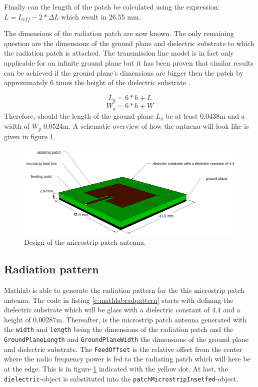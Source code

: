 Finally can the length of the patch be calculated using the expression: $L = L_{eff} - 2 * \Delta L$
which result in 26.55 mm.

The dimensions of the radiation patch are now known. The only remaining question are the dimensions of the ground plane and dielectric substrate to which the 
radiation patch is attached. The transmission line model is in fact only applicable for an infinite ground plane but it has been proven that similar results
can be achieved if the ground plane's dimensions are bigger then the patch by approximately 6 times the height of the dielectric substrate \cite{J14_antennadesign,J15_antennadesign}.

\begin{equation} 
L_{g} = 6 * h + L
\end{equation}
\begin{equation} 
W_{g} = 6 * h + W
\end{equation}
Therefore, should the length of the ground plane $L_{g}$ be at least 0.0438m and a width of $W_{g}$ 0.0524m.
A schematic overview of how the antnena will look like is given in figure \ref{fig:antennadesign}.
\begin{figure}[h!]
\centering
  \includegraphics[width=\textwidth]{../images/MicrostripAntenna.png}
  \caption{Design of the microstrip patch antenna.}
  \label{fig:antennadesign}
\end{figure}

\subsection{Radiation pattern}
Mathlab is able to generate the radiation pattern for the this microstrip patch antenna.
The code in  listing \ref{c:mathlabradpattern} starts with defining the dielectric substrate which will be glass with a dielectric constant
of 4.4 and a height of 0.00287m. Thereafter, is the microstrip patch antenna generated with the \verb|width| and \verb|length| being the dimensions
of the radiation patch and the \verb|GroundPlaneLength| and \verb|GroundPlaneWidth| the dimensions of the ground plane and dielectric substrate.
The \verb|FeedOffset| is the relative offset from the center where the radio frequency power is fed to the radiating patch which will here be
at the edge. This  is in figure \ref{fig:antennadesign} indicated with the yellow dot. At last, the \verb|dielectric|-object is substituted into the 
\verb|patchMicrostripInsetfed|-object.

